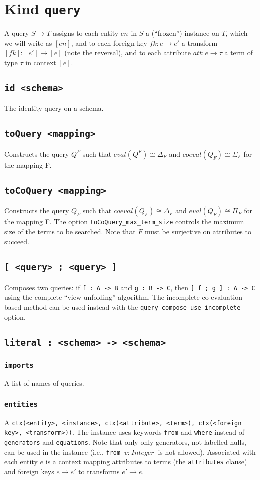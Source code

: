 \documentclass[10pt]{book}
\begin{document}
\chapter{Kind  {\tt query}}
A query $S \to T$ assigns to each entity $en$ in $S$ a (``frozen'') instance on $T$, which we will write as $[en]$, and to each foreign key $fk : e \to e'$ a transform $[fk] : [e'] \to [e]$ (note the reversal), and to each attribute $att : e \to \tau$ a term of type $\tau$ in context $[e]$.  

\section{{\tt id <schema>}}
The identity query on a schema.

\section{{\tt toQuery <mapping>}}
Constructs the query $Q^F$ such that $eval(Q^F) \cong \Delta_F$ and $coeval(Q_F) \cong \Sigma_F$ for the mapping F.

\section{{\tt toCoQuery <mapping>}}
Constructs the query $Q_F$ such that $coeval(Q_F) \cong \Delta_F$ and $eval(Q_F) \cong \Pi_F$ for the mapping F.  The option {\tt toCoQuery\_max\_term\_size} controls the maximum size of the terms to be searched.  Note that $F$ must be surjective on attributes to succeed.

\section{{\tt [ <query> ; <query> ]}}
Composes two queries: if {\tt f : A -> B} and {\tt g : B -> C}, then {\tt [ f ; g ] : A -> C} using the complete ``view unfolding'' algorithm.   The incomplete co-evaluation based method can be used instead with the {\tt query\_compose\_use\_incomplete} option.

\section{{\tt literal : <schema> -> <schema>}}
\subsection{{\tt imports}}
A list of names of queries.
\subsection{{\tt entities}}
A {\tt ctx(<entity>, <instance>, ctx(<attribute>, <term>), {\tt ctx(<foreign key>, <transform>)})}.  The instance uses keywords {\tt from} and {\tt where} instead of {\tt generators} and {\tt equations}.  Note that only only generators, not labelled nulls, can be used in the instance (i.e., {\tt from} $\ v:Integer \ $ is not allowed).  Associated with each entity $e$ is a context mapping attributes to terms (the {\tt attributes} clause) and foreign keys $e \to e'$ to transforms $e' \to e$. 
\end{document}

